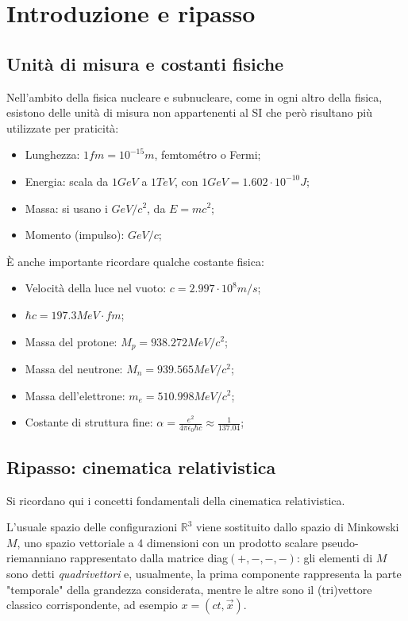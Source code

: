 \section{Introduzione e ripasso}
\subsection{Unità di misura e costanti fisiche}
Nell'ambito della fisica nucleare e subnucleare, come in ogni altro della fisica,
esistono delle unità di misura non appartenenti al SI che però risultano più
utilizzate per praticità:
\begin{itemize}
    \item Lunghezza: $1 fm = 10^{-15}m$, femtométro o Fermi;
    \item Energia: scala da $1 GeV$ a $ 1 TeV $, con $ 1GeV = 1.602 \cdot 10^{-10} J$;
    \item Massa: si usano i $ GeV/c^2 $, da $E=mc^2$;
    \item Momento (impulso): $ GeV/c $; 
\end{itemize}

È anche importante ricordare qualche costante fisica:
\begin{itemize}
    \item Velocità della luce nel vuoto: $ c = 2.997 \cdot10^8 m/s $;
    \item $\hbar c = 197.3 MeV\cdot fm$;
    \item Massa del protone: $M_p = 938.272 MeV/c^2$;
    \item Massa del neutrone: $M_n = 939.565 MeV/c^2$;
    \item Massa dell'elettrone: $m_e = 510.998 MeV/c^2$;
    \item Costante di struttura fine: $\alpha = \frac{e^2}{4\pi \epsilon_0 \hbar c}\approx \frac{1}{137.04}$;
\end{itemize}
\subsection{Ripasso: cinematica relativistica}
Si ricordano qui i concetti fondamentali della cinematica relativistica.

L'usuale spazio delle configurazioni $ \mathbb{R}^3$ viene sostituito dallo spazio
di Minkowski $ M $, uno spazio vettoriale a 4 dimensioni con un prodotto scalare
pseudo-riemanniano rappresentato dalla matrice diag$ (+,-,-,-) $: gli elementi di
$ M $ sono detti \textit{quadrivettori} e, usualmente, la prima componente rappresenta
la parte "temporale" della grandezza considerata, mentre le altre sono il (tri)vettore
classico corrispondente, ad esempio $ x = (ct,\vec{x}) $.

